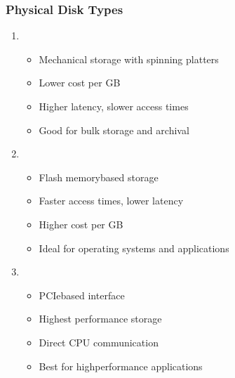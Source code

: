 \documentclass[letterpaper,10pt,english]{sphinxmanual}
\begin{document}
\subsubsection{Physical Disk Types}
\label{\detokenize{disk-management:physical-disk-types}}\begin{enumerate}
%
\item {} 
\sphinxAtStartPar
{}
\begin{itemize}
\item {} 
\sphinxAtStartPar
Mechanical storage with spinning platters

\item {} 
\sphinxAtStartPar
Lower cost per GB

\item {} 
\sphinxAtStartPar
Higher latency, slower access times

\item {} 
\sphinxAtStartPar
Good for bulk storage and archival

\end{itemize}

\item {} 
\sphinxAtStartPar
{}
\begin{itemize}
\item {} 
\sphinxAtStartPar
Flash memory\sphinxhyphen{}based storage

\item {} 
\sphinxAtStartPar
Faster access times, lower latency

\item {} 
\sphinxAtStartPar
Higher cost per GB

\item {} 
\sphinxAtStartPar
Ideal for operating systems and applications

\end{itemize}

\item {} 
\sphinxAtStartPar
{}
\begin{itemize}
\item {} 
\sphinxAtStartPar
PCIe\sphinxhyphen{}based interface

\item {} 
\sphinxAtStartPar
Highest performance storage

\item {} 
\sphinxAtStartPar
Direct CPU communication

\item {} 
\sphinxAtStartPar
Best for high\sphinxhyphen{}performance applications

\end{itemize}

\end{enumerate}
\end{document}

